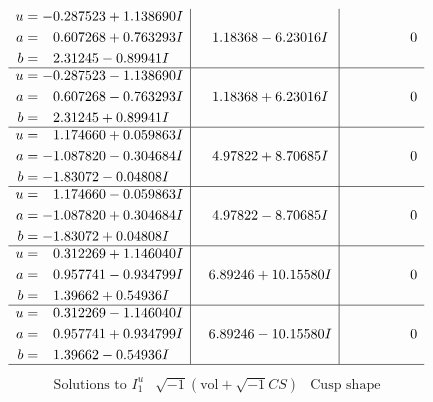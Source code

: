 \documentclass[1p]{elsarticle_modified}
\theoremstyle{definition}
\newcommand{\I}{\sqrt{-1}}
\begin{document}
$$\begin{array}{c|c|c}
\begin{aligned}
u &= -0.287523 + 1.138690 I \\
a &= \phantom{-}0.607268 + 0.763293 I \\
b &= \phantom{-}2.31245 - 0.89941 I\end{aligned}
 & \phantom{-}1.18368 - 6.23016 I & \phantom{-0.000000 } 0 \\ \hline\begin{aligned}
u &= -0.287523 - 1.138690 I \\
a &= \phantom{-}0.607268 - 0.763293 I \\
b &= \phantom{-}2.31245 + 0.89941 I\end{aligned}
 & \phantom{-}1.18368 + 6.23016 I & \phantom{-0.000000 } 0 \\ \hline\begin{aligned}
u &= \phantom{-}1.174660 + 0.059863 I \\
a &= -1.087820 - 0.304684 I \\
b &= -1.83072 - 0.04808 I\end{aligned}
 & \phantom{-}4.97822 + 8.70685 I & \phantom{-0.000000 } 0 \\ \hline\begin{aligned}
u &= \phantom{-}1.174660 - 0.059863 I \\
a &= -1.087820 + 0.304684 I \\
b &= -1.83072 + 0.04808 I\end{aligned}
 & \phantom{-}4.97822 - 8.70685 I & \phantom{-0.000000 } 0 \\ \hline\begin{aligned}
u &= \phantom{-}0.312269 + 1.146040 I \\
a &= \phantom{-}0.957741 - 0.934799 I \\
b &= \phantom{-}1.39662 + 0.54936 I\end{aligned}
 & \phantom{-}6.89246 + 10.15580 I & \phantom{-0.000000 } 0 \\ \hline\begin{aligned}
u &= \phantom{-}0.312269 - 1.146040 I \\
a &= \phantom{-}0.957741 + 0.934799 I \\
b &= \phantom{-}1.39662 - 0.54936 I\end{aligned}
 & \phantom{-}6.89246 - 10.15580 I & \phantom{-0.000000 } 0\\
 \hline 
 \end{array}$$\newpage$$\begin{array}{c|c|c}  
\text{Solutions to }I^u_{1}& \I (\text{vol} + \sqrt{-1}CS) & \text{Cusp shape}\\

\end{array}$$
\end{document}
